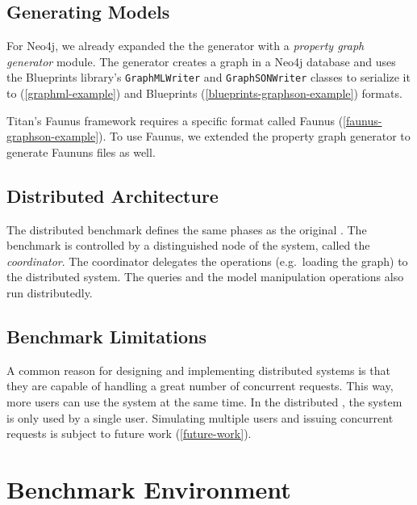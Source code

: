 \subsection{Generating Models}

For Neo4j, we already expanded the the generator with a \emph{property graph generator} module. The generator creates a graph in a Neo4j database and uses the Blueprints library's \texttt{GraphMLWriter} and \texttt{GraphSONWriter} classes to serialize it to \graphml{} (\autoref{graphml-example}) and Blueprints \graphson{} (\autoref{blueprints-graphson-example}) formats. 

Titan's Faunus framework requires a specific format called Faunus \graphson{} (\autoref{faunus-graphson-example}). To use Faunus, we extended the property graph generator to generate Faununs \graphson{} files as well.

\subsection{Distributed Architecture}

The distributed benchmark defines the same phases as the original \tb{}. The benchmark is controlled by a distinguished node of the system, called the \emph{coordinator}. The coordinator delegates the operations (e.g.\ loading the graph) to the distributed system. The queries and the model manipulation operations also run distributedly.


\subsection{Benchmark Limitations}

A common reason for designing and implementing distributed systems is that they are capable of handling a great number of concurrent requests. This way, more users can use the system at the same time. In the distributed \tb{}, the system is only used by a single user. Simulating multiple users and issuing concurrent requests is subject to future work (\autoref{future-work}).


\section{Benchmark Environment}
\label{sec:benchmark-environment}

